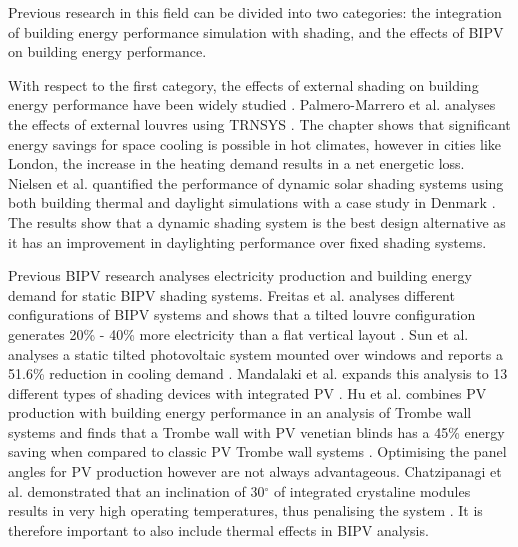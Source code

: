 
Previous research in this field can be divided into two categories: the integration of building energy performance simulation with shading, and the effects of BIPV on building energy performance. 

With respect to the first category, the effects of external shading on building energy performance have been widely studied \cite{bellia2014overview}. Palmero-Marrero et al. analyses the effects of external louvres using TRNSYS \cite{palmero2010effect}. The chapter shows that significant energy savings for space cooling is possible in hot climates, however in cities like London, the increase in the heating demand results in a net energetic loss. Nielsen et al. quantified the performance of dynamic solar shading systems using both building thermal and daylight simulations with a case study in Denmark \cite{nielsen2011quantifying}. The results show that a dynamic shading system is the best design alternative as it has an improvement in daylighting performance over fixed shading systems.\ 

Previous BIPV research analyses electricity production and building energy demand for static BIPV shading systems. Freitas et al. analyses different configurations of BIPV systems and shows that a tilted louvre configuration generates 20\% - 40\% more electricity than a flat vertical layout \cite{freitas2015maximizing}. Sun et al. analyses a static tilted photovoltaic system mounted over windows and reports a 51.6\% reduction in cooling demand \cite{sun2012optimum}. Mandalaki et al. expands this analysis to 13 different types of shading devices with integrated PV \cite{mandalaki2012assessment}. Hu et al. combines PV production with building energy performance in an analysis of Trombe wall systems and finds that a Trombe wall with PV venetian blinds has a 45\% energy saving when compared to classic PV Trombe wall systems \cite{hu2017comparative}. Optimising the panel angles for PV production however are not always advantageous. Chatzipanagi et al. demonstrated that an inclination of 30$^{\circ}$ of integrated crystaline modules results in very high operating temperatures, thus penalising the system \cite{chatzipanagi2016bipv}. It is therefore important to also include thermal effects in BIPV analysis. \\

